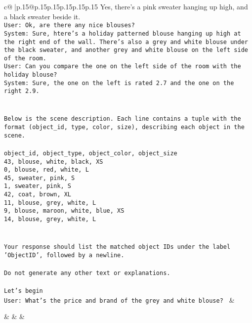 \documentclass{article}
\begin{document}
{\begin{supertabular}{c@{$\;$}|p{.15\linewidth}@{}p{.15\linewidth}p{.15\linewidth}p{.15\linewidth}p{.15\linewidth}p{.15\linewidth}}
{{{Yes, there's a pink sweater hanging up high, and a black sweater beside it.\\ \tt User: Ok, are there any nice blouses?\\ \tt System: Sure, htere's a holiday patterned blouse hanging up high at the right end of the wall.  There's also a grey and white blouse under the black sweater, and another grey and white blouse on the left side of the room.\\ \tt User: Can you compare the one on the left side of the room with the holiday blouse?\\ \tt System: Sure, the one on the left is rated 2.7 and the one on the right 2.9.\\ \tt \\ \tt \\ \tt Below is the scene description. Each line contains a tuple with the format (object_id, type, color, size), describing each object in the scene.\\ \tt \\ \tt object_id, object_type, object_color, object_size\\ \tt 43, blouse, white, black, XS\\ \tt 0, blouse, red, white, L\\ \tt 45, sweater, pink, S\\ \tt 1, sweater, pink, S\\ \tt 42, coat, brown, XL\\ \tt 11, blouse, grey, white, L\\ \tt 9, blouse, maroon, white, blue, XS\\ \tt 14, blouse, grey, white, L\\ \tt \\ \tt \\ \tt Your response should list the matched object IDs under the label 'ObjectID', followed by a newline.\\ \tt \\ \tt Do not generate any other text or explanations.\\ \tt \\ \tt Let's begin\\ \tt User: What's the price and brand of the grey and white blouse? 
	  } 
	   } 
	   } 
	 & \\ 
 

    \theutterance {}  

    &  
	 & & \\ 
 


\end{supertabular}}
\end{document}
